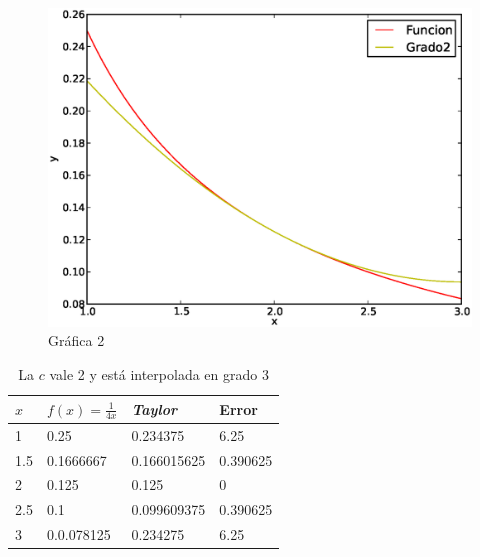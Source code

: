 \documentclass[a4paper,12pt]{article}
\begin{document}
\begin{figure}[ht]
  \begin{center}
    \includegraphics[scale=.6]{tercera.eps}
    \caption{Gráfica 2} 
  
  \end{center}
\end{figure}

\newpage

\begin{table}[!hbt]
\begin{center}
\begin{tabular}[c]{||l | l ||l|l||}
\hline
\hline
$x$  & $f(x)=\frac{1}{4x}$ & {\em Taylor} & Error \\
\hline
1 &0.25& 0.234375 & 6.25 \\
\hline
1.5 &0.1666667&0.166015625&  0.390625\\
\hline
2 &0.125 &0.125 &  0 \\
\hline
2.5 &0.1 &0.099609375 &  0.390625 \\
\hline
3 &  0.0.078125 &  0.234275& 6.25  \\
\hline
\hline
\end{tabular}
\caption{La $c$ vale 2 y está interpolada en grado 3}
\end{center}
\end{table}
\end{document}

